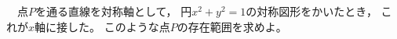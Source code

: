 \begin{problem}
  　点$P$を通る直線を対称軸として，
円$x^2+y^2=1$の対称図形をかいたとき，
これが$x$軸に接した。
このような点$P$の存在範囲を求めよ。
\end{problem}
